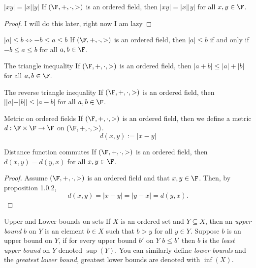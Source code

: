 \documentclass{report}
\begin{document}
\begin{proposition}{$|xy| = |x||y|$}{}
  If $\left(\F, +, \cdot, >\right)$ is an ordered field,
  then $|xy| = |x||y|$ for all $x,y \in \F$.
\end{proposition}

\begin{proof}
  I will do this later, right now I am lazy
\end{proof}

\begin{fact}{$|a| \leq b \iff -b \leq a \leq b$}{}
  If $\left(\F, +, \cdot, >\right)$ is an ordered field,
  then $|a| \leq b$ if and only if $-b \leq a \leq b$ for all $a, b \in \F$.
\end{fact}

\begin{fact}{The triangle inequality}{}
  If $\left(\F, +, \cdot, >\right)$ is an ordered field,
  then $|a + b| \leq |a| + |b|$ for all $a, b \in \F$.
\end{fact}

\begin{fact}{The reverse triangle inequality}{}
  If $\left(\F, +, \cdot, >\right)$ is an ordered field,
  then $||a|-|b|| \leq |a-b|$ for all $a, b \in \F$.
\end{fact}

\begin{definition}{Metric on ordered fields}{}
  If $\left(\F, +, \cdot, >\right)$ is an ordered field,
  then we define a metric $d: \F \times \F \rightarrow \F$ on $(\F, +, \cdot, >)$.
  $$d(x, y) := |x - y|$$
\end{definition}

\begin{lemma}{Distance function commutes}{}
  If $\left(\F, +, \cdot, >\right)$ is an ordered field,
  then $d(x, y) = d(y, x)$ for all $x,y \in \F$.
\end{lemma}

\begin{proof}
  Assume $\left(\F, +, \cdot, >\right)$ is an ordered field
  and that $x,y \in \F$.
  Then, by proposition 1.0.2,
  $$d(x, y) = |x - y| = |y - x| = d(y, x).$$
\end{proof}

\begin{definition}{Upper and Lower bounds on sets}{}
  If $X$ is an ordered set and $Y \subseteq X$,
  then an \emph{upper bound} $b$ on $Y$ is an element $b \in X$ such that $b > y$ for all $y \in Y$.
  Suppose $b$ is an upper bound on $Y$,
  if for every upper bound $b'$ on $Y$ $b \leq b'$ then $b$ is the \emph{least upper bound} on $Y$ denoted $\sup(Y)$.
  You can similarly define \emph{lower bounds} and the \emph{greatest lower bound}, greatest lower bounds are denoted with $\inf(X)$.
\end{definition}
\end{document}
